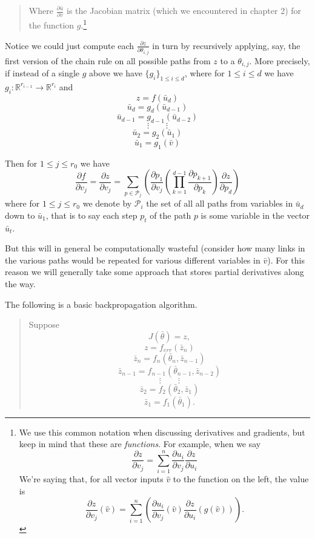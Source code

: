 \documentclass{article}
\begin{document}
\begin{itemize}
\begin{quote}
 Where $\frac{\partial \bar{u}}{\partial \bar{v}}$ is the Jacobian matrix (which we encountered in chapter 2) for the function $g$.\footnote{
 We use this common notation when discussing derivatives and gradients, but keep in mind that these are \emph{functions}.  For example, when we say 
 $$\frac{\partial z}{\partial v_{j}} = \sum_{i = 1}^{n} \frac{\partial u_{i}}{\partial v_{j}}\frac{\partial z}{\partial u_{i}}$$
 We're saying that, for all vector inputs $\hat{v}$ to the function on the left, the value is 
  $$\frac{\partial z}{\partial v_{j}} (\hat{v})= \sum_{i = 1}^{n} \left( \frac{\partial u_{i}}{\partial v_{j}} (\hat{v}) \frac{\partial z}{\partial u_{i}} (g(\hat{v}))\right).$$
 }
\end{quote}
Notice we could just compute each $\frac{\partial z}{\partial \theta_{i, j}}$ in turn by recursively applying, say, the first version of the chain rule on all possible paths from $z$ to a $\theta_{i,j}$.  More precisely,
 if instead of a single $g$ above we have $\{g_{i}\}_{1\leq i \leq d}$, where for $1\leq i \leq d$ we have $g_{i}: \mathbb{R}^{r_{i-1}} \rightarrow \mathbb{R}^{r_{i}}$ and 
$$ z = f(\bar{u}_{d})$$
$$\bar{u}_{d} = g_{d}(\bar{u}_{d-1})$$ 
$$\bar{u}_{d-1}=  g_{d-1}(\bar{u}_{d-2}) $$ 
$$ \vdots  \qquad \vdots$$
$$  \bar{u}_{2}= g_{2}(\bar{u}_{1}) $$ 
$$  \bar{u}_{1}= g_{1}(\bar{v}) $$ 

Then for 
$1 \leq j \leq r_{0}$ we have
$$\frac{\partial f}{\partial v_{j}} = \frac{\partial z}{\partial v_{j}} = \sum_{p \in \mathscr{P}_{j}} \left(  \frac{\partial p_{1}}{\partial v_{j}} \left(\prod_{k = 1}^{d-1} \frac{\partial p_{k+1} }{\partial p_{k}} \right) \frac{\partial z}{\partial p_{d}}    \right)$$
where for $1 \leq j \leq r_{0}$ we denote by $\mathscr{P}_{i}$ the set of all all paths from variables in $\bar{u}_d$ down to $\bar{u}_{1}$, that is to say each step $p_{t}$  of the path $p$ is some variable in the vector $\bar{u}_{t}$.


But this will in general be computationally wasteful (consider how many links in the various paths would be repeated for various different variables in $\bar{v}$).  For this reason we will generally take some approach that stores partial derivatives along the way.

The following is a basic backpropagation algorithm.
\begin{quote}
Suppose 
$$J(\bar{\theta})  = z,$$
$$ z = f_{err}(\bar{z}_{n})$$ 
$$\bar{z}_{n} = f_{n}(\bar{\theta}_{n}, \bar{z}_{n-1})$$  
$$\bar{z}_{n-1}=  f_{n-1}(\bar{\theta}_{n-1}, \bar{z}_{n-2}) $$ 
$$ \vdots  \qquad \vdots$$
$$  \bar{z}_{2}= f_{2}(\bar{\theta}_{2}, \bar{z}_{1}) $$ 
$$  \bar{z}_{1}= f_{1}(\bar{\theta}_{1}).$$


\end{quote}
\end{itemize}
\end{document}
